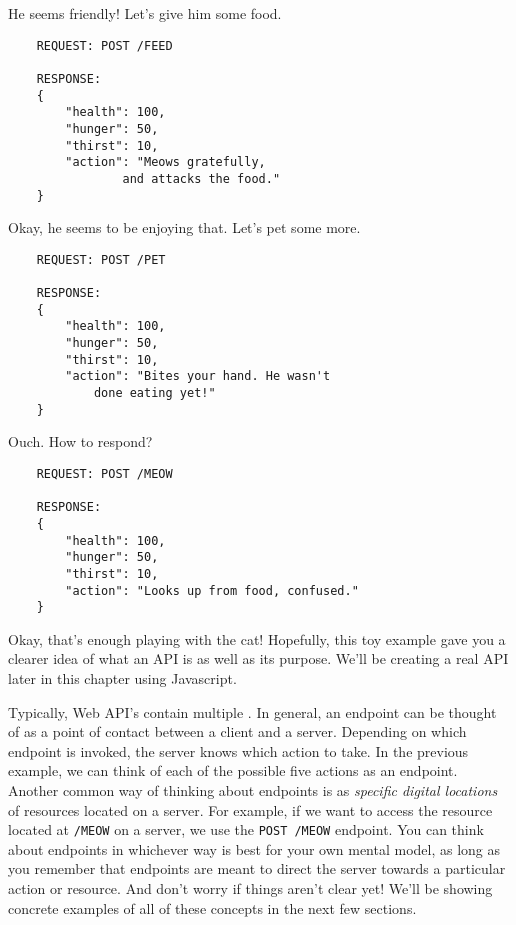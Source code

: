 \begin{kaobox}[title=Let's take a look at an example of a simple API.]
    He seems friendly! Let's give him some food.

    \begin{verbatim}
    REQUEST: POST /FEED

    RESPONSE: 
    {
        "health": 100,
        "hunger": 50,
        "thirst": 10,
        "action": "Meows gratefully, 
                and attacks the food."
    }
    \end{verbatim}

    Okay, he seems to be enjoying that. Let's pet some more.
    \begin{verbatim}
    REQUEST: POST /PET

    RESPONSE: 
    {
        "health": 100,
        "hunger": 50,
        "thirst": 10,
        "action": "Bites your hand. He wasn't 
            done eating yet!"
    }
    \end{verbatim}

    Ouch. How to respond?

    \begin{verbatim}
    REQUEST: POST /MEOW

    RESPONSE: 
    {
        "health": 100,
        "hunger": 50,
        "thirst": 10,
        "action": "Looks up from food, confused."
    }
    \end{verbatim}

    Okay, that's enough playing with the cat! Hopefully, this toy example gave you a clearer idea of what an API is as well as its purpose. We'll be creating a real API later in this chapter using Javascript.

\end{kaobox}

Typically, Web API's contain multiple . In general, an endpoint can be thought of as a point of contact between a client and a server. Depending on which endpoint is invoked, the server knows which action to take. In the previous example, we can think of each of the possible five actions as an endpoint. Another common way of thinking about endpoints is as \emph{specific digital locations} of resources located on a server. For example, if we want to access the resource located at \texttt{/MEOW} on a server, we use the \texttt{POST /MEOW} endpoint. You can think about endpoints in whichever way is best for your own mental model, as long as you remember that endpoints are meant to direct the server towards a particular action or resource. And don't worry if things aren't clear yet! We'll be showing concrete examples of all of these concepts in the next few sections.

